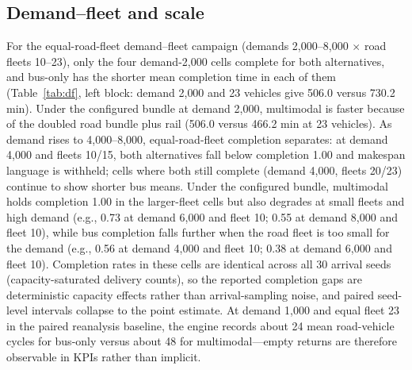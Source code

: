 \documentclass{ieeeaccess}
\begin{document}
\subsection{Demand--fleet and scale}
For the equal-road-fleet demand--fleet campaign (demands 2{,}000--8{,}000 $\times$ road fleets 10--23), only the four demand-2{,}000 cells complete for both alternatives, and bus-only has the shorter mean completion time in each of them (Table~\ref{tab:df}, left block: demand 2{,}000 and 23 vehicles give 506.0 versus 730.2 min). Under the configured bundle at demand 2{,}000, multimodal is faster because of the doubled road bundle plus rail (506.0 versus 466.2 min at 23 vehicles). As demand rises to 4{,}000--8{,}000, equal-road-fleet completion separates: at demand 4{,}000 and fleets 10/15, both alternatives fall below completion 1.00 and makespan language is withheld; cells where both still complete (demand 4{,}000, fleets 20/23) continue to show shorter bus means. Under the configured bundle, multimodal holds completion 1.00 in the larger-fleet cells but also degrades at small fleets and high demand (e.g., 0.73 at demand 6{,}000 and fleet 10; 0.55 at demand 8{,}000 and fleet 10), while bus completion falls further when the road fleet is too small for the demand (e.g., 0.56 at demand 4{,}000 and fleet 10; 0.38 at demand 6{,}000 and fleet 10). Completion rates in these cells are identical across all 30 arrival seeds (capacity-saturated delivery counts), so the reported completion gaps are deterministic capacity effects rather than arrival-sampling noise, and paired seed-level intervals collapse to the point estimate. At demand 1{,}000 and equal fleet 23 in the paired reanalysis baseline, the engine records about 24 mean road-vehicle cycles for bus-only versus about 48 for multimodal---empty returns are therefore observable in KPIs rather than implicit.
\end{document}
